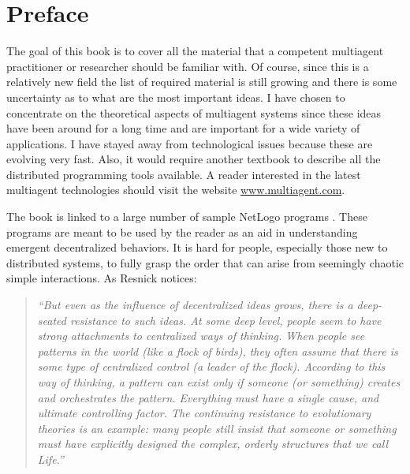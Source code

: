 \chapter*{Preface}

The goal of this book is to cover all the material that a competent
multiagent practitioner or researcher should be familiar with. Of
course, since this is a relatively new field the list of required
material is still growing and there is some uncertainty as to what are
the most important ideas. I have chosen to concentrate on the
theoretical aspects of multiagent systems since these ideas have been
around for a long time and are important for a wide variety of
applications. I have stayed away from technological issues because
these are evolving very fast.  Also, it would require another textbook
to describe all the distributed programming tools available. A reader
interested in the latest multiagent technologies should visit the
website \url{www.multiagent.com}.

The book is linked to a large number of sample NetLogo programs
\cite{netlogo}.  These programs are meant to be used by the reader as
an aid in understanding emergent decentralized behaviors. It is hard
for people, especially those new to distributed systems, to fully
grasp the order that can arise from seemingly chaotic simple
interactions. As Resnick notices:
\begin{quotation}
  \emph{``But even as the influence of decentralized ideas grows, there is a
  deep-seated resistance to such ideas. At some deep level, people
  seem to have strong attachments to centralized ways of
  thinking. When people see patterns in the world (like a flock of
  birds), they often assume that there is some type of centralized
  control (a leader of the flock). According to this way of thinking,
  a pattern can exist only if someone (or something) creates and
  orchestrates the pattern. Everything must have a single cause, and
  ultimate controlling factor. The continuing resistance to
  evolutionary theories is an example: many people still insist that
  someone or something must have explicitly designed the complex,
  orderly structures that we call Life.''} \cite{resnick94a}
\end{quotation}


